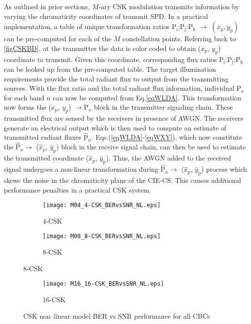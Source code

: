 As outlined in prior sections, $M$-ary CSK modulation transmits information by varying the chromaticity coordinates of transmit SPD. In a practical implementation, a table of unique transformation ratios P$_{\text{i}}$:P$_{\text{j}}$:P$_{\text{k}}$ $\rightarrow$ $(x_{\text{p}},y_{\text{p}})$ can be pre-computed for each of the $M$ constellation points. Referring back to \figurename{ }\ref{figCSKBD}, at the transmitter the data is color coded to obtain ($x_{\text{p}}$, $y_{\text{p}}$) coordinate to transmit. Given this coordinate, corresponding flux ratios P$_{\text{i}}$:P$_{\text{j}}$:P$_{\text{k}}$ can be looked up from the pre-computed table. The target illumination requirements provide the total radiant flux to output from the transmitting sources. With the flux ratio and the total radiant flux information, individual P$_{n}$ for each band $n$ can now be computed from Eq.\eqref{eqWLDA}. This transformation now forms the ($x_{\text{p}}$, $y_{\text{p}}$) $\rightarrow  \text{P}_{n}$ block in the transmitter signaling chain. These transmitted flux are sensed by the receivers in presence of AWGN. The receivers generate an electrical output which is then used to compute an estimate of transmitted radiant fluxes $\hat{\text{P}}_{n}$. Eqs.(\ref{eqWLDA}-\ref{eqWXY}), which now constitute the $\hat{\text{P}}_{n}\rightarrow$ ($\hat{x}_{\text{p}}$, $\hat{y}_{\text{p}}$) block in the receive signal chain, can then be used to estimate the transmitted coordinate ($\hat{x}_{\text{p}}$, $\hat{y}_{\text{p}}$). Thus, the AWGN added to the received signal undergoes a non-linear transformation during $\hat{\text{P}}_{n}\rightarrow$ ($\hat{x}_{\text{p}}$, $\hat{y}_{\text{p}}$) process which skews the noise in the chromaticity plane of the CIE-CS. This causes additional performance penalties in a practical CSK system.

\begin{figure}[!t]
	\centering
		\begin{subfigure}{\textwidth}
		\centering
			\texttt{[image: M04\_4-CSK\_BERvsSNR\_NL.eps]}
			\caption{4-CSK}
			\label{fig4SNR_NL}
		\end{subfigure}
		\begin{subfigure}{\textwidth}
		\centering
			\texttt{[image: M08\_8-CSK\_BERvsSNR\_NL.eps]}
			\caption{8-CSK}
			\label{fig8SNR_NL}
		\end{subfigure}
\end{figure}
\begin{figure}[!t]		
	\ContinuedFloat
		\begin{subfigure}{\textwidth}
		\centering
			\texttt{[image: M16\_16-CSK\_BERvsSNR\_NL.eps]}
			\caption{16-CSK}
			\label{fig16SNR_NL}
		\end{subfigure}
	\caption{CSK non--linear model BER vs SNR performance for all CBCs}
	\label{figBERvsSNR_NL}
\end{figure}

